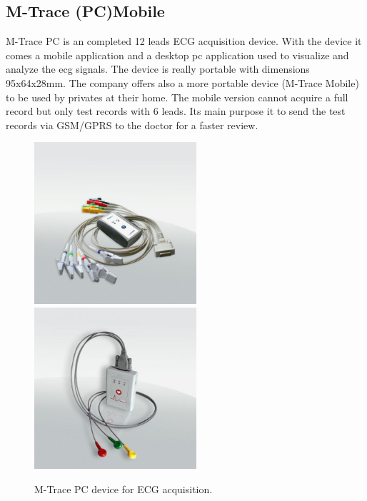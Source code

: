 \subsection{M-Trace (PC)Mobile}
M-Trace PC is an completed 12 leads ECG acquisition device. With the device it comes a mobile application and a desktop pc application used to visualize and analyze the ecg signals. The device is really portable with dimensions 95x64x28mm.  The company offers also a more portable device (M-Trace Mobile) to be used by privates at their home. The mobile version cannot acquire a full record but only test records with 6 leads. Its main purpose it to send the test records via GSM/GPRS to the doctor for a faster review.
\begin{figure}[ht!]
	\centering
	\includegraphics[width=60mm]{figures/ch3/4a.png}
	\includegraphics[width=60mm]{figures/ch3/4b.png}
	\caption{M-Trace PC device for ECG acquisition.}
	\label{fig3.4}
\end{figure}

